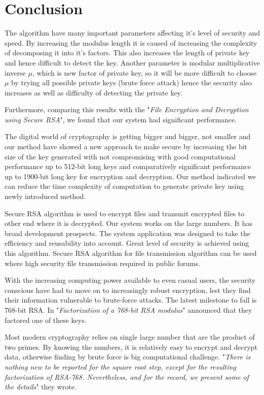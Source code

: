 \documentclass[12pt,journal,compsoc]{IEEEtran}
\begin{document}
\section{{Conclusion}}

The algorithm have many important parameters affecting it's level of security and speed. By increasing the modulus length it is caused of increasing the complexity of decomposing it into it's factors. This also increases the length of private key and hence difficult to detect the key. Another parameter is modular multiplicative inverse $\mu$, which is new factor of private key, so it will be more difficult to choose $\mu$ by trying all possible private keys (brute force attack) hence the security also increases as well as difficulty of detecting the private key.


Furthermore, comparing this results with the "\emph{File Encryption and Decryption using Secure RSA}"\cite{securersa}, we found that our system had significant performance.

The digital world of cryptography is getting bigger and bigger, not smaller and our method have showed a new approach to make secure by increasing the bit size of the key generated with not compromising with good computational performance up to 512-bit long keys and comparatively significant performance up to 1900-bit long key for encryption and decryption.  Our method indicated we can reduce the time complexity of computation to generate private key using newly introduced method.


Secure RSA algorithm is used to encrypt files and transmit encrypted files to other end where it is decrypted. Our system works on the large numbers. It has broad development prospects. The system application was designed to take the efficiency and reusability into account. Great level of security is achieved using this algorithm. Secure RSA algorithm for file transmission algorithm can be used where high security file transmission required in public forums.


With the increasing computing power available to even casual users, the security conscious have had to move on to increasingly robust encryption, lest they find their information vulnerable to brute-force attacks. The latest milestone to fall is 768-bit RSA. In "\emph{Factorization of a 768-bit RSA modulus}"\cite{768_key} announced that they factored one of these keys. 


Most modern cryptography relies on single large number that are the product of two primes. By knowing the numbers, it is relatively easy to encrypt and decrypt data, otherwise finding by brute force is big computational challenge. "\emph{There is nothing new to be reported for the square root step, except for the resulting factorization of RSA-768. Nevertheless, and for the record, we present some of the details}"\cite{768_key} they wrote.
\end{document}
